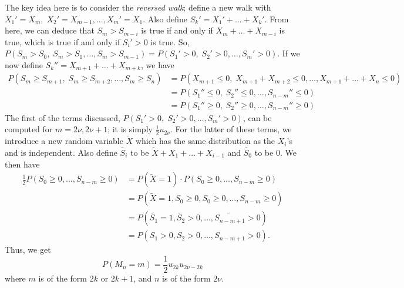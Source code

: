 \documentclass[15pt,a4paper]{book}
\theoremstyle{definition}
\newcommand{\eax}[1]{\emph{#1}\index{#1}} %
\begin{document}
The key idea here is to consider the \eax{reversed walk}; define a new walk with $X_{1}'=X_{m},\; X_{2}'=X_{m-1},\ldots,X_{m}'=X_{1}$. Also define $S_{k}' = X_{1}' + \ldots + X_{k}'$. From here, we can deduce that $S_{m}>S_{m-i}$ is true if and only if $X_{m}+\ldots+X_{m-i}$ is true, which is true if and only if $S_{i}'>0$ is true. So, $P(S_{m}>S_{0},\; S_{m}>S_{1},\ldots,S_{m}>S_{m-1}) = P(S_{1}'>0,\; S_{2}'>0, \ldots, S_{m}'>0)$. If we now define $S_{k}''=X_{m+1}+\ldots+X_{m+k}$, we have
\begin{align*}
    P(S_{m} \geq S_{m+1},\; S_{m} \geq S_{m+2}, \ldots, S_{m} \geq S_{n}) &= P(X_{m+1}\leq 0,\; X_{m+1}+X_{m+2}\leq 0, \ldots, X_{m+1}+\ldots+X_{n}\leq 0) \\
    &= P(S_{1}''\leq 0,\; S_{2}''\leq 0,\ldots,S_{n-m}''\leq 0) \\
    &= P(S_{1}''\geq 0,\; S_{2}''\geq 0,\ldots,S_{n-m}''\geq 0)
\end{align*}
The first of the terms discussed, $P(S_{1}'>0,\; S_{2}'>0, \ldots, S_{m}'>0)$, can be computed for $m = 2\nu, 2\nu+1$; it is simply $\frac{1}{2}u_{2\nu}$. For the latter of these terms, we introduce a new random variable $\tilde{X}$ which has the same distribution as the $X_{i}$'s and is independent. Also define $\tilde{S_{i}}$ to be $\tilde{X}+X_{1}+\ldots+X_{i-1}$ and $\tilde{S_{0}}$ to be $0$. We then have
\begin{align}
    \frac{1}{2}P(S_{0} \geq 0, \ldots, S_{n-m} \geq 0) &= P(\tilde{X}=1) \cdot P(S_{0} \geq 0, \ldots, S_{n-m} \geq 0) \\
    &= P(\tilde{X}=1,S_{0} \geq 0, S_{0} \geq 0, \ldots, S_{n-m} \geq 0) \\
    &= P(\tilde{S_{1}}=1,\tilde{S_{2}}>0,\ldots,\tilde{S_{n-m+1}}>0) \\
    &= P(S_{1}>0,S_{2}>0,\ldots,S_{n-m+1}>0).
\end{align}
Thus, we get
\begin{equation}
    P(M_{n}=m) = \frac{1}{2} u_{2k}u_{2\nu-2k}
\end{equation}
where $m$ is of the form $2k$ or $2k+1$, and $n$ is of the form $2\nu$.




\end{document}
